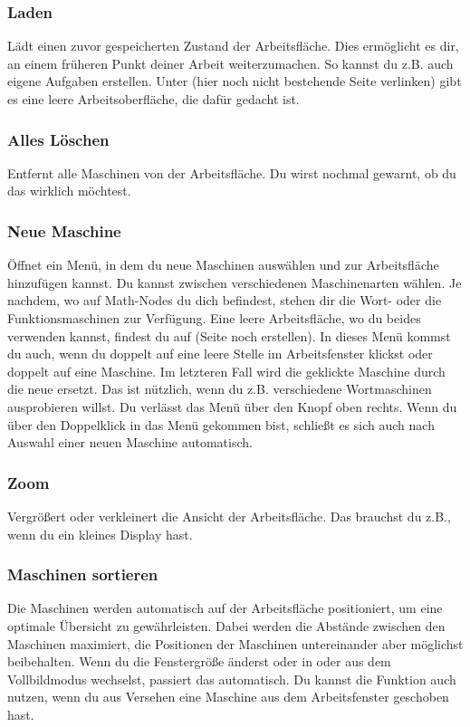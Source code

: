 \documentclass[12pt]{report}
\begin{document}
\subsubsection{Laden}
Lädt einen zuvor gespeicherten Zustand der Arbeitsfläche. Dies ermöglicht es dir, an einem früheren Punkt deiner Arbeit weiterzumachen. So kannst du z.B. auch eigene Aufgaben erstellen. Unter (hier noch nicht bestehende Seite verlinken) gibt es eine leere Arbeitsoberfläche, die dafür gedacht ist.
\subsubsection{Alles Löschen}
Entfernt alle Maschinen von der Arbeitsfläche. Du wirst nochmal gewarnt, ob du das wirklich möchtest.
\subsubsection{Neue Maschine}
Öffnet ein Menü, in dem du neue Maschinen auswählen und zur Arbeitsfläche hinzufügen kannst. Du kannst zwischen verschiedenen Maschinenarten wählen. Je nachdem, wo auf Math-Nodes du dich befindest, stehen dir die Wort- oder die Funktionsmaschinen zur Verfügung. Eine leere Arbeitsfläche, wo du beides verwenden kannst, findest du auf (Seite noch erstellen). In dieses Menü kommst du auch, wenn du doppelt auf eine leere Stelle im Arbeitsfenster klickst oder doppelt auf eine Maschine. Im letzteren Fall wird die geklickte Maschine durch die neue ersetzt. Das ist nützlich, wenn du z.B. verschiedene Wortmaschinen ausprobieren willst. Du verlässt das Menü über den Knopf oben rechts. Wenn du über den Doppelklick in das Menü gekommen bist, schließt es sich auch nach Auswahl einer neuen Maschine automatisch.
\subsubsection{Zoom}
Vergrößert oder verkleinert die Ansicht der Arbeitsfläche. Das brauchst du z.B., wenn du ein kleines Display hast.
\subsubsection{Maschinen sortieren}
Die Maschinen werden automatisch auf der Arbeitsfläche positioniert, um eine optimale Übersicht zu gewährleisten. Dabei werden die Abstände zwischen den Maschinen maximiert, die Positionen der Maschinen untereinander aber möglichst beibehalten. Wenn du die Fenstergröße änderst oder in oder aus dem Vollbildmodus wechselst, passiert das automatisch. Du kannst die Funktion auch nutzen, wenn du aus Versehen eine Maschine aus dem Arbeitsfenster geschoben hast.
\end{document}
